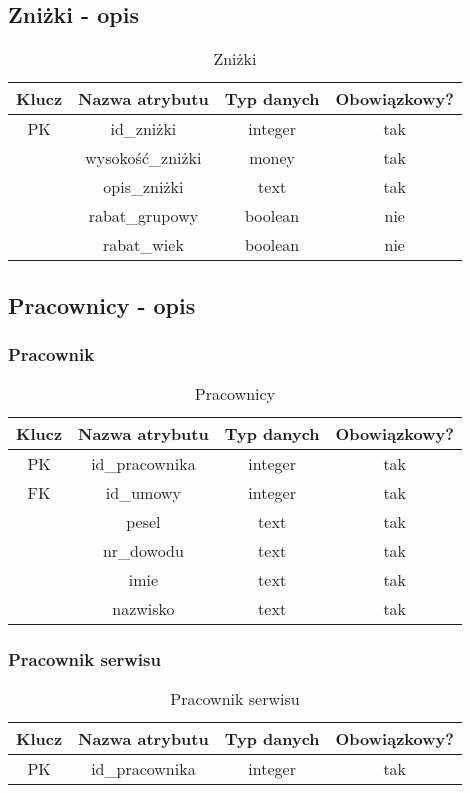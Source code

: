\subsection{Zniżki - opis}
\begin{table}[H]
	\centering
	\begin{tabular}{|c|c|c|c|}
		\hline
		Klucz & Nazwa atrybutu      & Typ danych & Obowiązkowy? \\ \hline
		PK    & id\_zniżki         & integer    & tak           \\ \hline
		      & wysokość\_zniżki & money      & tak           \\ \hline
		      & opis\_zniżki       & text       & tak           \\ \hline
		      & rabat\_grupowy      & boolean    & nie           \\ \hline
		      & rabat\_wiek         & boolean    & nie           \\ \hline
	\end{tabular}
	\caption{Zniżki}
\end{table}

\subsection{Pracownicy - opis}
\subsubsection{Pracownik}
\begin{table}[H]
	\centering
	\begin{tabular}{|c|c|c|c|}
		\hline
		Klucz & Nazwa atrybutu & Typ danych & Obowiązkowy? \\ \hline
		PK    & id\_pracownika & integer    & tak           \\ \hline
		FK    & id\_umowy      & integer    & tak           \\ \hline
		      & pesel          & text       & tak           \\ \hline
		      & nr\_dowodu     & text       & tak           \\ \hline
		      & imie           & text       & tak           \\ \hline
		      & nazwisko       & text       & tak           \\ \hline
	\end{tabular}
	\caption{Pracownicy}
\end{table}

\subsubsection{Pracownik serwisu}
\begin{table}[H]
	\centering
	\begin{tabular}{|c|c|c|c|}
		\hline
		Klucz & Nazwa atrybutu & Typ danych & Obowiązkowy? \\ \hline
		PK    & id\_pracownika & integer    & tak           \\ \hline
	\end{tabular}
	\caption{Pracownik serwisu}
\end{table}


